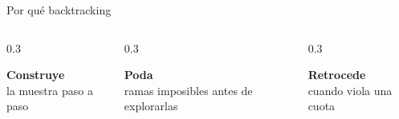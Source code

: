 \documentclass[aspectratio=169, 10pt]{beamer}
\begin{document}
\begin{frame}{Por qué \alert{backtracking}}
  \vspace{0.3cm}
  \begin{columns}[c]
    \begin{column}{0.3\textwidth}
      \begin{tarjeta}
        \begin{center}
          {\Large\faHammer\par}
          \vspace{4pt}
          {\small\bfseries Construye}\\[2pt]
          {\footnotesize\color{cgris} la muestra paso a paso}
        \end{center}
      \end{tarjeta}
    \end{column}
    \begin{column}{0.3\textwidth}
      \begin{tarjeta}
        \begin{center}
          {\Large\faCut\par}
          \vspace{4pt}
          {\small\bfseries Poda}\\[2pt]
          {\footnotesize\color{cgris} ramas imposibles antes de explorarlas}
        \end{center}
      \end{tarjeta}
    \end{column}
    \begin{column}{0.3\textwidth}
      \begin{tarjeta}
        \begin{center}
          {\Large\faUndo\par}
          \vspace{4pt}
          {\small\bfseries Retrocede}\\[2pt]
          {\footnotesize\color{cgris} cuando viola una cuota}
        \end{center}
      \end{tarjeta}
    \end{column}
  \end{columns}
\end{frame}
\end{document}
